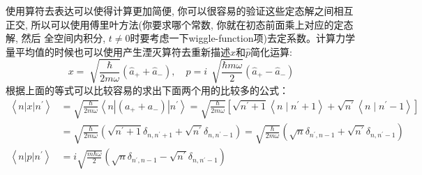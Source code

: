 \documentclass[a4paper,zihao=-4,linespread=1]{ctexrep}
\newenvironment{lequation}{\large\begin{equation}}{\end{equation}}
\begin{document}
    使用算符去表达可以使得计算更加简便, 你可以很容易的验证这些定态解之间相互正交, 所以可以使用傅里叶方法(你要求哪个常数, 你就在初态前面乘上对应的定态解, 然后
    全空间内积分, $t\neq0$时要考虑一下wiggle-function项)去定系数。计算力学量平均值的时候也可以使用产生湮灭算符去重新描述$x$和$\hat{p}$简化运算:
    \begin{lequation}
        \boxed{
            x =\sqrt[]{\frac{\hbar}{2m\omega}}\left(\hat{a}_++\hat{a}_-\right), \quad 
            p =i\,\sqrt[]{\frac{\hbar m \omega}{2}}\left(\hat{a}_+-\hat{a}_-\right)
        }
    \end{lequation}
    根据上面的等式可以比较容易的求出下面两个用的比较多的公式：
    \begin{align*}
        \left\langle n|x| n^{\prime}\right\rangle & =\sqrt{\frac{\hbar}{2 m \omega}}\left\langle n\left|\left(a_{+}+a_{-}\right)\right| n^{\prime}\right\rangle=\sqrt{\frac{\hbar}{2 m \omega}}\left[\sqrt{n^{\prime}+1}\left\langle n \mid n^{\prime}+1\right\rangle+\sqrt{n^{\prime}}\left\langle n \mid n^{\prime}-1\right\rangle\right] \\
        & =\sqrt{\frac{\hbar}{2 m \omega}}\left(\sqrt{n^{\prime}+1} \delta_{n, n^{\prime}+1}+\sqrt{n^{\prime}} \delta_{n, n^{\prime}-1}\right)=\boxed{\sqrt{\frac{\hbar}{2 m \omega}}\left(\sqrt{n} \delta_{n^{\prime}, n-1}+\sqrt{n^{\prime}} \delta_{n, n^{\prime}-1}\right) }\\
        \left\langle n|p| n^{\prime}\right\rangle & =\boxed{i \sqrt{\frac{m \hbar \omega}{2}}\left(\sqrt{n} \delta_{n^{\prime}, n-1}-\sqrt{n^{\prime}} \delta_{n, n^{\prime}-1}\right)}
    \end{align*}
\end{document}
